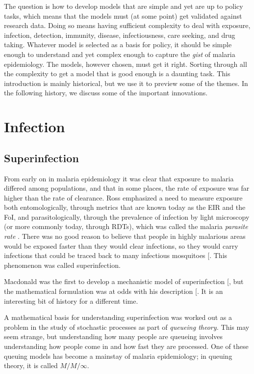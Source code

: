 \documentclass[
]{book}
\begin{document}
The question is how to develop models that are simple and yet are up to policy tasks, which means that the models must (at some point) get validated against research data. Doing so means having sufficient complexity to deal with exposure, infection, detection, immunity, disease, infectiousness, care seeking, and drug taking. Whatever model is selected as a basis for policy, it should be simple enough to understand and yet complex enough to capture the \emph{gist} of malaria epidemiology. The models, however chosen, must get it right. Sorting through all the complexity to get a model that is good enough is a daunting task. This introduction is mainly historical, but we use it to preview some of the themes. In the following history, we discuss some of the important innovations.

\section{Infection}\label{infection-1}

\subsection{Superinfection}\label{superinfection-1}

From early on in malaria epidemiology it was clear that exposure to malaria differed among populations, and that in some places, the rate of exposure was far higher than the rate of clearance. Ross emphasized a need to measure exposure both entomologically, through metrics that are known today as the EIR and the FoI, and parasitologically, through the prevalence of infection by light microscopy (or more commonly today, through RDTs), which was called the malaria \emph{parasite rate} . There was no good reason to believe that people in highly malarious areas would be exposed faster than they would clear infections, so they would carry infections that could be traced back to many infectious mosquitoes {[}\citeproc{ref-WaltonGA1947ControlMalaria}{76}{]}. This phenomenon was called superinfection.

Macdonald was the first to develop a mechanistic model of superinfection {[}\citeproc{ref-MacdonaldG1950Superinfection}{60}{]}, but the mathematical formulation was at odds with his description {[}\citeproc{ref-FinePEM1975SuperinfectionProblem}{51}{]}. It is an interesting bit of history for a different time.

A mathematical basis for understanding superinfection was worked out as a problem in the study of stochastic processes as part of \emph{queueing theory.} This may seem strange, but understanding how many people are queueing involves understanding how people come in and how fast they are processed. One of these queuing models has become a mainstay of malaria epidemiology; in queuing theory, it is called \(M/M/\infty\).
\end{document}
